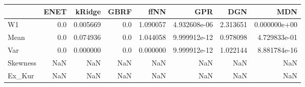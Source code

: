 \begin{tabular}{lrrrrrrr}
\toprule
{} &  ENET &    kRidge &  GBRF &      ffNN &           GPR &       DGN &           MDN \\
\midrule
W1       &   0.0 &  0.005669 &   0.0 &  1.090057 &  4.932608e-06 &  2.313651 &  0.000000e+00 \\
Mean     &   0.0 &  0.074936 &   0.0 &  1.044058 &  9.999912e-12 &  0.978098 &  4.729833e-01 \\
Var      &   0.0 &  0.000000 &   0.0 &  0.000000 &  9.999912e-12 &  1.022144 &  8.881784e-16 \\
Skewness &   NaN &       NaN &   NaN &       NaN &           NaN &       NaN &           NaN \\
Ex\_Kur   &   NaN &       NaN &   NaN &       NaN &           NaN &       NaN &           NaN \\
\bottomrule
\end{tabular}

